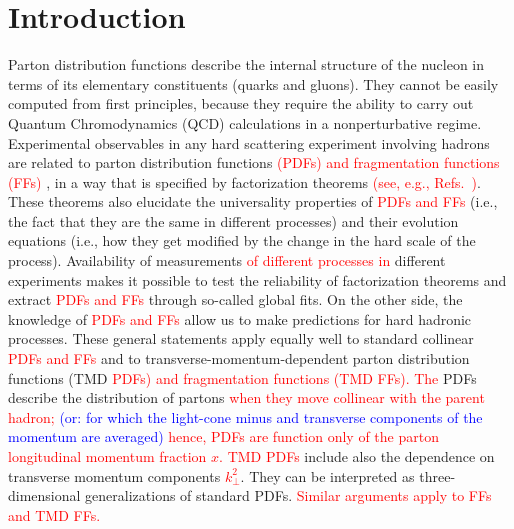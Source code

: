 \documentclass[aps,preprintnumbers,showpacs,nofootinbib,superscriptaddress,floatfix]{revtex4}
\newcommand{\T}{\perp}
\begin{document}

\maketitle

\section{Introduction}

Parton distribution functions describe the internal structure of the nucleon
in terms of its elementary constituents (quarks and gluons). They cannot be
easily computed from first principles, because they require the ability to
carry out Quantum Chromodynamics (QCD) calculations in a nonperturbative
regime. Experimental observables in any hard scattering experiment
involving hadrons are related to parton distribution functions \textcolor{red}{(PDFs) and fragmentation functions (FFs)} , in a way that is specified by factorization theorems \textcolor{red}{(see, e.g., Refs.~\cite{Collins:1989gx,Collins:2011zzd})}. These theorems also elucidate the universality properties of \textcolor{red}{PDFs and FFs} (i.e., the fact that they are the same in different processes) and their evolution equations (i.e., how they get modified by the change in
the hard scale of the process). Availability of measurements \textcolor{red}{of different processes in} different
experiments makes it possible to test the reliability of factorization theorems and extract \textcolor{red}{PDFs and FFs} through so-called global fits. On the other side, the knowledge of \textcolor{red}{PDFs and FFs} allow us
to make predictions for hard hadronic processes. These general statements apply equally well to
standard collinear \textcolor{red}{PDFs and FFs} and to transverse-momentum-dependent parton distribution functions (TMD \textcolor{red}{PDFs) and fragmentation functions (TMD FFs). The} PDFs
describe the distribution of partons \textcolor{red}{when they move collinear with the parent hadron;} \textcolor{blue}{(or: for which the light-cone minus and transverse components of the momentum are averaged)} \textcolor{red}{hence, PDFs are function only of the parton longitudinal momentum fraction $x$. TMD PDFs} include also the dependence on transverse momentum components \textcolor{red}{$k_{\T}^2$}. They can be interpreted as three-dimensional generalizations of standard PDFs. \textcolor{red}{Similar arguments apply to FFs and TMD FFs. }
\end{document}
